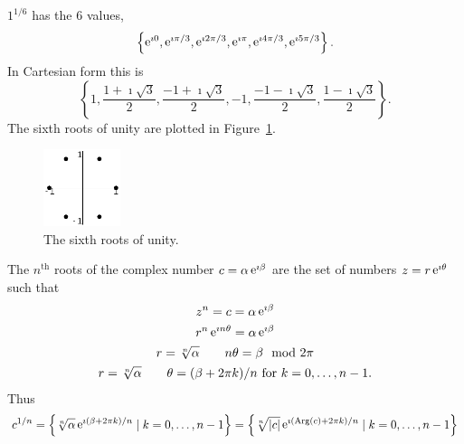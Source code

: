 \begin{Example}
  $1^{1/6}$ has the 6 values,
  \[
  \left\{ \mathop{\mathrm{e}}\nolimits^{\imath 0}, \mathop{\mathrm{e}}\nolimits^{\imath \pi/3}, \mathop{\mathrm{e}}\nolimits^{\imath 2 \pi/3}, \mathop{\mathrm{e}}\nolimits^{\imath \pi}, \mathop{\mathrm{e}}\nolimits^{\imath 4 \pi/3},
    \mathop{\mathrm{e}}\nolimits^{\imath 5 \pi/3} \right\}.
  \]
  In Cartesian form this is
  \[
  \left\{ 1, \frac{1 + \imath \sqrt{3}}{2}, \frac{-1 + \imath \sqrt{3}}{2},
    -1, \frac{-1 - \imath \sqrt{3}}{2}, \frac{1 - \imath \sqrt{3}}{2} \right\}.
  \]
  The sixth roots of unity are plotted in Figure~\ref{sixth_roots}.
  \begin{figure}[h!]
    \begin{center}
        \includegraphics[width=0.2\textwidth]{fcv/number/sixth_roots}
    \end{center}
    \caption{The sixth roots of unity.}
    \label{sixth_roots}
  \end{figure}
\end{Example}




The $n^{\mathrm{th}}$ roots of the complex number $c = \alpha \mathop{\mathrm{e}}\nolimits^{\imath \beta}$
are the set of numbers $z = r \mathop{\mathrm{e}}\nolimits^{\imath \theta}$ such that
\begin{gather*}
  z^n = c = \alpha \e^{\imath \beta} 
  \\
  r^n \e^{\imath n \theta} = \alpha \e^{\imath \beta} 
  \\
  r = \sqrt[n]{\alpha} \qquad n \theta = \beta \mod 2 \pi 
  \\
  r = \sqrt[n]{\alpha} \qquad \theta = (\beta + 2 \pi k) / n\ \mathrm{for}\ 
  k = 0, \ldots, n - 1.
\end{gather*}
Thus 
\[
c^{1/n} = \left\{ \sqrt[n]{\alpha} \mathop{\mathrm{e}}\nolimits^{\imath (\beta + 2 \pi k) / n } \mid k = 0, \ldots, n - 1 \right\}
= \left\{ \sqrt[n]{|c|} \mathop{\mathrm{e}}\nolimits^{\imath (\mathop{\mathrm{Arg}}\nolimits(c) + 2 \pi k) / n } \mid k = 0, \ldots, n - 1 \right\}
\]


